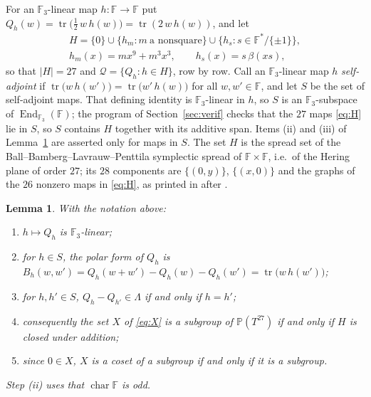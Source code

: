 \documentclass[11pt]{amsart}
\newtheorem{lemma}[theorem]{Lemma}
\theoremstyle{remark}
\newcommand{\Fq}{\mathbb{F}}
\newcommand{\tr}{\operatorname{tr}}
\begin{document}
For an $\Fq_{3}$-linear map $h\colon\Fq\to\Fq$ put
$Q_{h}(w)=\tr\bigl(\tfrac12\,w\,h(w)\bigr)=\tr(2\,w\,h(w))$, and let
\begin{equation}\label{eq:H}
\begin{gathered}
  H=\{0\}\cup\{h_{m}:m\ \text{a nonsquare}\}\cup\{h_{s}:s\in\Fq^{*}/\{\pm1\}\},\\
  h_{m}(x)=mx^{9}+m^{3}x^{3},\qquad h_{s}(x)=s\,\beta(xs),
\end{gathered}
\end{equation}
so that $|H|=27$ and $\mathcal Q=\{Q_{h}:h\in H\}$, row by row. Call an
$\Fq_{3}$-linear map $h$ \emph{self-adjoint} if $\tr\bigl(w\,h(w')\bigr)
=\tr\bigl(w'\,h(w)\bigr)$ for all $w,w'\in\Fq$, and let $S$ be the set of
self-adjoint maps. That defining identity is $\Fq_{3}$-linear in $h$, so $S$ is
an $\Fq_{3}$-subspace of $\operatorname{End}_{\Fq_{3}}(\Fq)$; the program of
Section~\ref{sec:verif} checks that the $27$ maps \eqref{eq:H} lie in $S$, so $S$
contains $H$ together with its additive span. Items (ii) and (iii) of
Lemma~\ref{lem:bridge} are asserted only for maps in $S$. The set $H$ is
the spread set of the Ball--Bamberg--Lavrauw--Penttila symplectic spread of
$\Fq\times\Fq$, i.e.\ of the Hering plane of order $27$; its $28$ components are
$\{(0,y)\}$, $\{(x,0)\}$ and the graphs of the $26$ nonzero maps in
\eqref{eq:H}, as printed in \cite[Corollary 1]{Abd} after \cite{BBLP}.

\begin{lemma}\label{lem:bridge}
With the notation above:
\begin{enumerate}
\item[\textup{(i)}] $h\mapsto Q_{h}$ is $\Fq_{3}$-linear;
\item[\textup{(ii)}] for $h\in S$, the polar form of $Q_{h}$ is
      $B_{h}(w,w')=Q_{h}(w+w')-Q_{h}(w)-Q_{h}(w')=\tr\bigl(w\,h(w')\bigr)$;
\item[\textup{(iii)}] for $h,h'\in S$, $Q_{h}-Q_{h'}\in\Lambda$ if and only if
      $h=h'$;
\item[\textup{(iv)}] consequently the set $X$ of \eqref{eq:X} is a subgroup of
      $\mathbb P(T^{27})$ if and only if $H$ is closed under addition;
\item[\textup{(v)}] since $0\in X$, $X$ is a coset of a subgroup if and only if
      it is a subgroup.
\end{enumerate}
Step \textup{(ii)} uses that $\operatorname{char}\Fq$ is odd.
\end{lemma}
\end{document}

